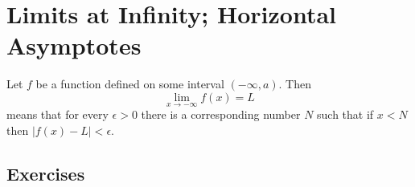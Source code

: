 \section{Limits at Infinity; Horizontal Asymptotes}
\setcounter{theorem}{7}
\begin{definition}
	Let $f$ be a function defined on some interval $\left( -\infty, a \right)$. Then
	\begin{equation*}
	\lim\limits_{x \to -\infty} f\left(x\right) = L
	\end{equation*}
	means that for every $\epsilon > 0$ there is a corresponding number $N$ such that if $x < N$ then $\left| f\left(x\right) - L \right| < \epsilon$.
\end{definition}

\subsection{Exercises}
\setcounter{exercise}{70}

